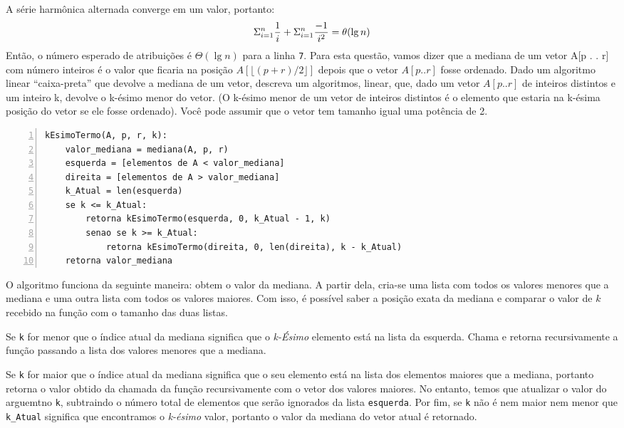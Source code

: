 \documentclass[12pt,a4paper]{article}
\begin{document}
    A série harmônica alternada converge em um valor, portanto:
    \begin{equation}
        \Sigma_{i=1}^n \frac{1}{i} + \Sigma_{i=1}^n \frac{-1}{i^2} = \theta(\lg n)
        \notag
    \end{equation}
    Então, o número esperado de atribuições é $\Theta(\lg n)$ para a linha
\verb|7|.  Para esta questão, vamos dizer que a mediana de um vetor
A[p . . r] com número inteiros é o valor que ficaria na posição $A[\lfloor(p + r)/2\rfloor]$
depois que o vetor $A[p . . r]$ fosse ordenado. Dado um algoritmo linear
“caixa-preta” que devolve a mediana de um vetor, descreva um algoritmos, linear,
que, dado um vetor $A[p . . r]$ de inteiros distintos e um inteiro k, devolve o
k-ésimo menor do vetor. (O k-ésimo menor de um vetor de inteiros distintos é o
elemento que estaria na k-ésima posição do vetor se ele fosse ordenado). Você
pode assumir que o vetor tem tamanho igual uma potência de 2.
\begin{lstlisting}[numbers=left,
    stepnumber=1,]
kEsimoTermo(A, p, r, k):
    valor_mediana = mediana(A, p, r)
    esquerda = [elementos de A < valor_mediana]
    direita = [elementos de A > valor_mediana]
    k_Atual = len(esquerda)
    se k <= k_Atual:
        retorna kEsimoTermo(esquerda, 0, k_Atual - 1, k)
        senao se k >= k_Atual:
            retorna kEsimoTermo(direita, 0, len(direita), k - k_Atual)
    retorna valor_mediana
\end{lstlisting}
O algoritmo funciona da seguinte maneira: obtem o valor da mediana. A partir
dela, cria-se uma lista com todos os valores menores que a mediana e uma outra
lista com todos os valores maiores. Com isso, é possível saber a posição exata
da mediana e comparar o valor de $k$ recebido na função com o tamanho das duas
listas.

Se \verb|k| for menor que o índice atual da mediana significa que o
\emph{k-Ésimo} elemento está na lista da esquerda. Chama e retorna recursivamente a função
passando a lista dos valores menores que a mediana.

Se \verb|k| for maior que o índice atual da mediana significa que o seu elemento está
na lista dos elementos maiores que a mediana, portanto retorna o valor obtido da chamada da função
recursivamente com o vetor dos valores maiores. No entanto, temos que atualizar
o valor do arguemtno \verb|k|, subtraindo o número total de elementos que serão
ignorados da lista \verb|esquerda|. Por fim, se \verb|k| não é nem maior nem menor que \verb|k_Atual| significa que
encontramos o \emph{k-ésimo} valor, portanto o valor da mediana do vetor atual é
retornado.
\end{document}
